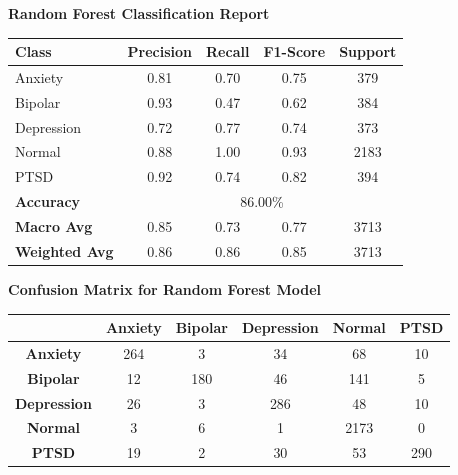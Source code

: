\begin{center}
    \textbf{Random Forest Classification Report} \\[0.5em]
    \begin{tabular}{|l|c|c|c|c|}
        \hline
        \textbf{Class} & \textbf{Precision} & \textbf{Recall} & \textbf{F1-Score} & \textbf{Support} \\ \hline
        Anxiety        & 0.81               & 0.70            & 0.75              & 379              \\ \hline
        Bipolar        & 0.93               & 0.47            & 0.62              & 384              \\ \hline
        Depression     & 0.72               & 0.77            & 0.74              & 373              \\ \hline
        Normal         & 0.88               & 1.00            & 0.93              & 2183             \\ \hline
        PTSD           & 0.92               & 0.74            & 0.82              & 394              \\ \hline
        \textbf{Accuracy} & \multicolumn{4}{|c|}{86.00\%} \\ \hline
        \textbf{Macro Avg} & 0.85            & 0.73            & 0.77              & 3713             \\ \hline
        \textbf{Weighted Avg} & 0.86         & 0.86            & 0.85              & 3713             \\ \hline
    \end{tabular}
\end{center}

\vspace{0.25em}

\begin{center}
    \textbf{Confusion Matrix for Random Forest Model} \\[0.5em]
    \begin{tabular}{|c|c|c|c|c|c|}
        \hline
        & \textbf{Anxiety} & \textbf{Bipolar} & \textbf{Depression} & \textbf{Normal} & \textbf{PTSD} \\ \hline
        \textbf{Anxiety}    & 264 & 3   & 34  & 68  & 10  \\ \hline
        \textbf{Bipolar}    & 12  & 180 & 46  & 141 & 5   \\ \hline
        \textbf{Depression} & 26  & 3   & 286 & 48  & 10  \\ \hline
        \textbf{Normal}     & 3   & 6   & 1   & 2173 & 0  \\ \hline
        \textbf{PTSD}       & 19  & 2   & 30  & 53  & 290 \\ \hline
    \end{tabular}
\end{center}

